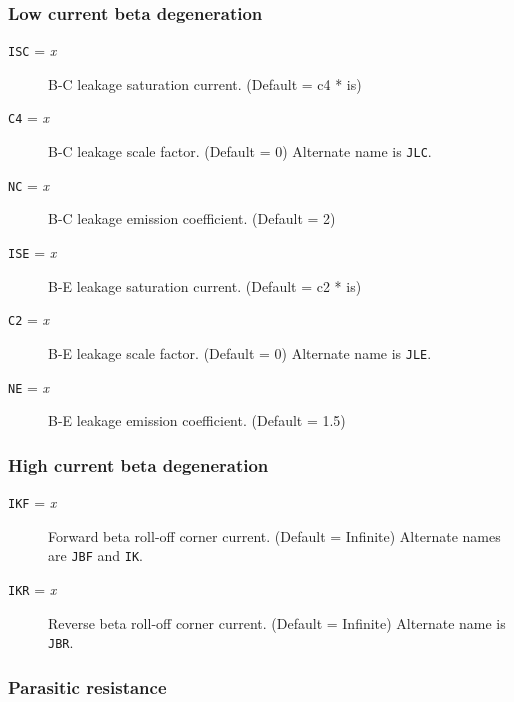 \subsubsection{Low current beta degeneration}

\begin{description}

\item[{\tt ISC} = {\it x}]
B-C leakage saturation current.  (Default = c4 * is)

\item[{\tt C4} = {\it x}]
B-C leakage scale factor. (Default = 0)  Alternate name is {\tt JLC}.

\item[{\tt NC} = {\it x}]
B-C leakage emission coefficient.  (Default = 2)

\item[{\tt ISE} = {\it x}]
B-E leakage saturation current.  (Default = c2 * is)

\item[{\tt C2} = {\it x}]
B-E leakage scale factor.  (Default = 0)  Alternate name is {\tt JLE}.

\item[{\tt NE} = {\it x}]
B-E leakage emission coefficient.  (Default = 1.5)

\end{description}

\subsubsection{High current beta degeneration}

\begin{description}

\item[{\tt IKF} = {\it x}]
Forward beta roll-off corner current.  (Default = Infinite) Alternate
names are {\tt JBF} and {\tt IK}.

\item[{\tt IKR} = {\it x}]
Reverse beta roll-off corner current.  (Default = Infinite) Alternate
name is {\tt JBR}.

\end{description}

\subsubsection{Parasitic resistance}

